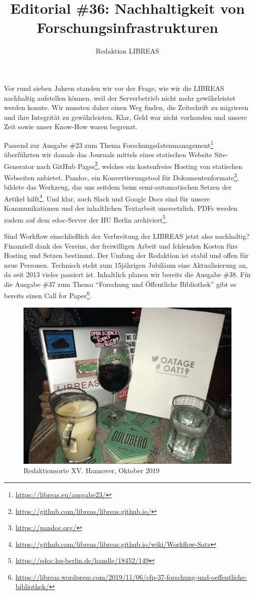 \documentclass[a4paper,
fontsize=11pt,
oneside,
numbers=noperiodatend,
parskip=half-,
bibliography=totoc,
final
]{scrartcl}
\title{\LARGE{Editorial \#36: Nachhaltigkeit von Forschungsinfrastrukturen}}%
\author{Redaktion LIBREAS} %
\date{}
\begin{document}
\maketitle
\thispagestyle{fancyplain} 


Vor rund sieben Jahren standen wir vor der Frage, wie wir die LIBREAS
nachhaltig aufstellen können, weil der Serverbetrieb nicht mehr
gewährleistet werden konnte. Wir mussten daher einen Weg finden, die
Zeitschrift zu migrieren und ihre Integrität zu gewährleisten. Klar,
Geld war nicht vorhanden und unsere Zeit sowie unser Know-How waren
begrenzt.

Passend zur Ausgabe \#23 zum Thema Forschungsdatenmanagement\footnote{\url{https://libreas.eu/ausgabe23/}}
überführten wir damals das Journals mittels eines statischen Website
Site-Generator nach GitHub Pages\footnote{\url{https://github.com/libreas/libreas.github.io/}},
welches ein kostenfreies Hosting von statischen Webseiten anbietet.
Pandoc, ein Konvertierungstool für Dokumentenformate\footnote{\url{https://pandoc.org/}},
bildete das Werkzeug, das uns seitdem beim semi-automatischen Setzen der
Artikel hilft\footnote{\url{https://github.com/libreas/libreas.github.io/wiki/Workflow-Satz}}.
Und klar, auch Slack und Google Docs sind für unsere Kommunikationen und
der inhaltlichen Textarbeit unersetzlich. PDFs werden zudem auf dem
edoc-Server der HU Berlin archiviert\footnote{\url{https://edoc.hu-berlin.de/handle/18452/149}}.

Sind Workflow einschließlich der Verbreitung der LIBREAS jetzt also
nachhaltig? Finanziell dank des Vereins, der freiwilligen Arbeit und
fehlenden Kosten fürs Hosting und Setzen bestimmt. Der Umfang der
Redaktion ist stabil und offen für neue Personen. Technisch steht zum
15jährigen Jubiläum eine Aktualisierung an, da seit 2013 vieles passiert
ist. Inhaltlich planen wir bereits die Ausgabe \#38. Für die Ausgabe
\#37 zum Thema \enquote{Forschung und Öffentliche Bibliothek} gibt es
bereits einen Call for Paper\footnote{\url{https://libreas.wordpress.com/2019/11/06/cfp-37-forschung-und-oeffentliche-bibliothek/}}.

\begin{figure}
\centering
\includegraphics{abb.jpg}
\caption{Redaktionsorte XV. Hannover, Oktober 2019}
\end{figure}
\end{document}
